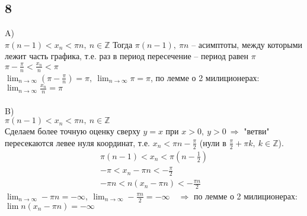 		\subsection{8}
		\begin{comment}Заметим, что $\cos(x)$ при $x \to 0$, равен $1 - \frac{x^2}{2} + o(x^4)$, то есть при $n \to \inf: \ \cos(\frac{x}{\sqrt{n}}) = 1 - \frac{x^2}{2n} + o(\frac{1}{n^2})$\\
		Тогда $\cos^n(\frac{x}{\sqrt{n}}) = (1 - \frac{x^2}{2n} + o(\frac{1}{n^2}))^n = (1 - \frac{x^2}{2} + \frac{x^4}{2^2} - \frac{x^6}{2^3} + ... ) + o(\frac{1}{n})$\\ 
		Откуда $\cos^n(\frac{x}{\sqrt{n}}) \to (1 - \frac{x^2}{2} + \frac{x^4}{2^2} - \frac{x^6}{2^3} + ... ) = \frac{1}{1 + \frac{x^2}{2} }$
		\end{comment}
		
		A)\\
		$\pi(n - 1) < x_n < \pi n,\ n \in \mathbb{Z}$ Тогда $\pi(n-1),\ \pi n$ -- асимптоты, между которыми лежит часть графика, т.е. раз в период пересечение -- период равен $\pi$\\
		$\pi - \frac{\pi}{n} < \frac{x_n}{n} < \pi$\\
		$\lim_{n \to \infty} (\pi - \frac{\pi}{n}) = \pi,\ \lim_{n \to \infty} \pi = \pi$, по лемме о 2 милиционерах: $\lim_{n \to \infty} \frac{x_n}{n} = \pi$
		\\ \\
		B)\\
		$\pi(n - 1) < x_n < \pi n,\ n \in \mathbb{Z}$\\
		Сделаем более точную оценку сверху $y = x$ при $x > 0,\ y > 0\ \Rightarrow$ "ветви" пересекаются левее нуля координат, т.е. $x_n < \pi n - \frac{\pi}{2}$ (нули в $\frac{\pi}{2} + \pi k,\ k \in \mathbb{Z}$).
		\begin{gather*}
			\pi (n - 1) < x_n < \pi (n - \frac{1}{2})\\
			-\pi < x_n - \pi n < -\frac{\pi}{2}\\
			-\pi n < n(x_n - \pi n) < -\frac{\pi n}{2}
		\end{gather*}
		$\lim_{n \to \infty} -\pi n = -\infty,\ \lim_{n \to \infty} -\frac{\pi n}{2} = -\infty \quad \Rightarrow$ по лемме о 2 милиционерах: $\lim n(x_n - \pi n) = -\infty$
		\\ \\